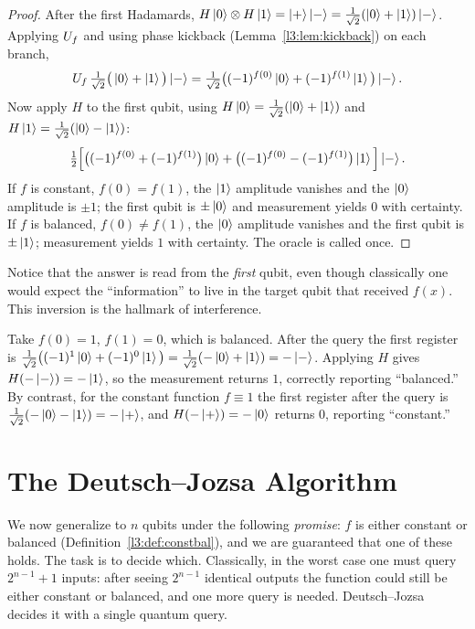 \begin{proof}
After the first Hadamards,
$H\ket{0}\otimes H\ket{1}=\ket{+}\ket{-}=\tfrac{1}{\sqrt2}(\ket{0}+\ket{1})\ket{-}$.
Applying $U_f$ and using phase kickback (Lemma~\ref{l3:lem:kickback}) on each branch,
\[
  U_f\,\tfrac{1}{\sqrt2}\big(\ket{0}+\ket{1}\big)\ket{-}
  =\tfrac{1}{\sqrt2}\big((-1)^{f(0)}\ket{0}+(-1)^{f(1)}\ket{1}\big)\ket{-}.
\]
Now apply $H$ to the first qubit, using $H\ket{0}=\tfrac{1}{\sqrt2}(\ket0+\ket1)$
and $H\ket{1}=\tfrac{1}{\sqrt2}(\ket0-\ket1)$:
\[
  \tfrac{1}{2}\Big[\big((-1)^{f(0)}+(-1)^{f(1)}\big)\ket{0}
  +\big((-1)^{f(0)}-(-1)^{f(1)}\big)\ket{1}\Big]\ket{-}.
\]
If $f$ is constant, $f(0)=f(1)$, the $\ket{1}$ amplitude vanishes and the
$\ket{0}$ amplitude is $\pm1$; the first qubit is $\pm\ket{0}$ and measurement
yields $0$ with certainty. If $f$ is balanced, $f(0)\neq f(1)$, the $\ket{0}$
amplitude vanishes and the first qubit is $\pm\ket{1}$; measurement yields $1$
with certainty. The oracle is called once.
\end{proof}

Notice that the answer is read from the \emph{first} qubit, even though classically
one would expect the ``information'' to live in the target qubit that received
$f(x)$. This inversion is the hallmark of interference.

\begin{example}[Deutsch on $f(a)=a\oplus 1$]
\label{l3:ex:deutsch}
Take $f(0)=1$, $f(1)=0$, which is balanced. After the query the first register is
$\tfrac{1}{\sqrt2}\big((-1)^{1}\ket0+(-1)^{0}\ket1\big)=\tfrac{1}{\sqrt2}(-\ket0+\ket1)=-\ket{-}$.
Applying $H$ gives $H(-\ket{-})=-\ket{1}$, so the measurement returns $1$,
correctly reporting ``balanced.'' By contrast, for the constant function
$f\equiv 1$ the first register after the query is
$\tfrac{1}{\sqrt2}(-\ket0-\ket1)=-\ket{+}$, and $H(-\ket{+})=-\ket0$ returns $0$,
reporting ``constant.''
\end{example}

\section{The Deutsch--Jozsa Algorithm}

We now generalize to $n$ qubits under the following \emph{promise}: $f$ is either
constant or balanced (Definition~\ref{l3:def:constbal}), and we are guaranteed that
one of these holds. The task is to decide which. Classically, in the worst case
one must query $2^{n-1}+1$ inputs: after seeing $2^{n-1}$ identical outputs the
function could still be either constant or balanced, and one more query is needed.
Deutsch--Jozsa decides it with a single quantum query.

